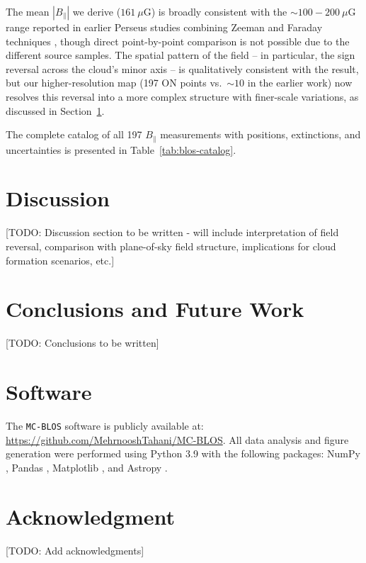 \documentclass[twocolumn]{aastex631}
\begin{document}
The mean $|B_\parallel|$ we derive ($161~\mu$G) is broadly consistent with the $\sim100-200~\mu$G range reported in earlier Perseus studies combining Zeeman and Faraday techniques \citep{tahani2018, tahani2022b}, though direct point-by-point comparison is not possible due to the different source samples. The spatial pattern of the field -- in particular, the sign reversal across the cloud's minor axis -- is qualitatively consistent with the \citet{tahani2018} result, but our higher-resolution map (197 ON points vs.\ $\sim10$ in the earlier work) now resolves this reversal into a more complex structure with finer-scale variations, as discussed in Section~\ref{sec:discussion}.

The complete catalog of all 197 $B_\parallel$ measurements with positions, extinctions, and uncertainties is presented in Table~\ref{tab:blos-catalog}.



\section{Discussion}
\label{sec:discussion}

[TODO: Discussion section to be written - will include interpretation of field reversal, comparison with plane-of-sky field structure, implications for cloud formation scenarios, etc.]

\section{Conclusions and Future Work}
\label{sec:conclusions}

[TODO: Conclusions to be written]

\section{Software}
The \texttt{MC-BLOS} software is publicly available at: \url{https://github.com/MehrnooshTahani/MC-BLOS}. All data analysis and figure generation were performed using Python 3.9 with the following packages: NumPy \citep{harris2020array}, Pandas \citep{mckinney2010data}, Matplotlib \citep{hunter2007matplotlib}, and Astropy \citep{astropy2013, astropy2018}.

\section{Acknowledgment}

[TODO: Add acknowledgments]




\end{document}
